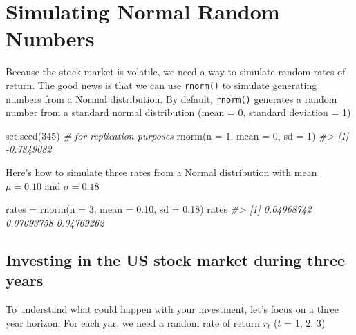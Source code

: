 \documentclass[
]{book}
\newenvironment{Shaded}{\begin{snugshade}}{\end{snugshade}}
\newcommand{\AttributeTok}[1]{\textcolor[rgb]{0.77,0.63,0.00}{#1}}
\newcommand{\CommentTok}[1]{\textcolor[rgb]{0.56,0.35,0.01}{\textit{#1}}}
\newcommand{\DecValTok}[1]{\textcolor[rgb]{0.00,0.00,0.81}{#1}}
\newcommand{\FloatTok}[1]{\textcolor[rgb]{0.00,0.00,0.81}{#1}}
\newcommand{\FunctionTok}[1]{\textcolor[rgb]{0.00,0.00,0.00}{#1}}
\newcommand{\NormalTok}[1]{#1}
\newcommand{\OtherTok}[1]{\textcolor[rgb]{0.56,0.35,0.01}{#1}}
\begin{document}
\hypertarget{simulating-normal-random-numbers}{%
\section{Simulating Normal Random Numbers}\label{simulating-normal-random-numbers}}

Because the stock market is volatile, we need a way to simulate random rates
of return. The good news is that we can use \texttt{rnorm()} to simulate generating
numbers from a Normal distribution. By default, \texttt{rnorm()} generates a random
number from a standard normal distribution (mean = 0, standard deviation = 1)

\begin{Shaded}
\begin{Highlighting}[]
\FunctionTok{set.seed}\NormalTok{(}\DecValTok{345}\NormalTok{)  }\CommentTok{\# for replication purposes}
\FunctionTok{rnorm}\NormalTok{(}\AttributeTok{n =} \DecValTok{1}\NormalTok{, }\AttributeTok{mean =} \DecValTok{0}\NormalTok{, }\AttributeTok{sd =} \DecValTok{1}\NormalTok{)}
\CommentTok{\#\textgreater{} [1] {-}0.7849082}
\end{Highlighting}
\end{Shaded}

Here's how to simulate three rates from a Normal distribution with mean
\(\mu = 0.10\) and \(\sigma = 0.18\)

\begin{Shaded}
\begin{Highlighting}[]
\NormalTok{rates }\OtherTok{=} \FunctionTok{rnorm}\NormalTok{(}\AttributeTok{n =} \DecValTok{3}\NormalTok{, }\AttributeTok{mean =} \FloatTok{0.10}\NormalTok{, }\AttributeTok{sd =} \FloatTok{0.18}\NormalTok{)}
\NormalTok{rates}
\CommentTok{\#\textgreater{} [1] 0.04968742 0.07093758 0.04769262}
\end{Highlighting}
\end{Shaded}

\hypertarget{investing-in-the-us-stock-market-during-three-years}{%
\subsection{Investing in the US stock market during three years}\label{investing-in-the-us-stock-market-during-three-years}}

To understand what could happen with your investment, let's focus on a three
year horizon. For each yar, we need a random rate of return \(r_t\) (\(t\) = 1, 2, 3)
\end{document}
